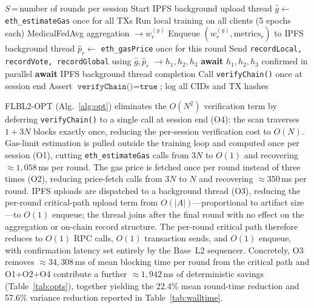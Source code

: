\documentclass{llncs}
\begin{document}
\begin{algorithm}[h]
\caption{Optimized FL-Blockchain session protocol (FLBL2-OPT)}
\label{alg:opt}
\begin{algorithmic}[1]
\Require $S$\,=\,number of rounds per session
\State Start IPFS background upload thread
\State $\hat{g} \leftarrow$ \texttt{eth\_estimateGas} once for all TXs  
  \State Run local training on all clients (5 epochs each)
  \State MedicalFedAvg aggregation $\rightarrow w_r^{(g)}$
  \State Enqueue $(w_r^{(g)},\text{metrics}_r)$ to IPFS background thread  
  \State $\hat{p}_r \leftarrow$ \texttt{eth\_gasPrice} once for this round  
  \State Send \texttt{recordLocal, recordVote, recordGlobal} using $\hat{g}, \hat{p}_r$ $\rightarrow h_1,h_2,h_3$
  \State \textbf{await} $h_1, h_2, h_3$ confirmed in parallel
\EndFor
\State \textbf{await} IPFS background thread completion  
\State Call \texttt{verifyChain()} once at session end  
\State Assert $\texttt{verifyChain()} = \texttt{true}$; log all CIDs and TX hashes
\end{algorithmic}
\end{algorithm}


FLBL2-OPT (Alg.~\ref{alg:opt}) eliminates the $O(N^2)$ verification term by
deferring \texttt{verifyChain()} to a single call at session end (O4): the scan
traverses $1{+}3N$ blocks exactly once, reducing the per-session verification cost
to $O(N)$.
Gas-limit estimation is pulled outside the training loop and computed once per
session (O1), cutting \texttt{eth\_estimateGas} calls from $3N$ to $O(1)$ and
recovering $\approx1{,}058$\,ms per round.
The gas price is fetched once per round instead of three times (O2), reducing
price-fetch calls from $3N$ to $N$ and recovering $\approx350$\,ms per round.
IPFS uploads are dispatched to a background thread (O3), reducing the per-round
critical-path upload term from $O(|A|)$---proportional to artifact size---to
$O(1)$ enqueue; the thread joins after the final round with no effect on the
aggregation or on-chain record structure.
The per-round critical path therefore reduces to $O(1)$ RPC calls, $O(1)$
transaction sends, and $O(1)$ enqueue, with confirmation latency set entirely
by the Base~L2 sequencer.
Concretely, O3 removes $\approx34{,}308$\,ms of mean blocking time per round from
the critical path and O1+O2+O4 contribute a further $\approx1{,}942$\,ms of
deterministic savings (Table~\ref{tab:opts}), together yielding the 22.4\% mean
round-time reduction and 57.6\% variance reduction reported in Table~\ref{tab:walltime}.
\end{document}
